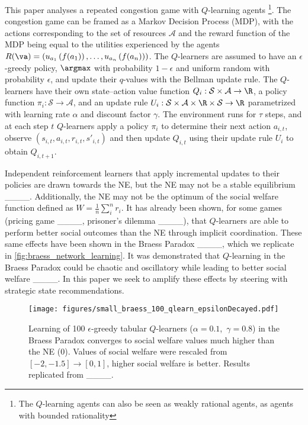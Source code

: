 This paper analyses a repeated congestion game with $Q$-learning agents \footnote{The $Q$-learning agents can also be seen as weakly rational agents, as agents with bounded rationality}. The congestion game can be framed as a Markov Decision Process (MDP), with the actions corresponding to the set of resources $\mathcal{A}$ and the reward function of the MDP being equal to the utilities experienced by the agents $R(\va) = \left(u_{a_1}\left(f(a_1)\right), \dots, u_{a_n}\left(f(a_n)\right)\right)$. The $Q$-learners are assumed to have an $\epsilon$-greedy policy, $\argmax$ with probability $1-\epsilon$ and uniform random with probability $\epsilon$, and update their $q$-values with the Bellman update rule. The $Q$-learners have their own state--action value function $Q_{i}: \mathcal{S} \times \mathcal{A} \rightarrow \R$, a policy function $\pi_i: \mathcal{S} \rightarrow \mathcal{A}$, and an update rule $U_i: \mathcal{S} \times \mathcal{A} \times \R \times \mathcal{S} \rightarrow \R$ parametrized with learning rate $\alpha$ and discount factor $\gamma$. The environment runs for $\tau$ steps, and at each step $t$ $Q$-learners apply a policy $\pi_i$ to determine their next action $a_{i,t}$, observe $(s_{i,t}, a_{i,t}, r_{i,t}, s'_{i,t})$ and then update $Q_{i,t}$ using their update rule $U_i$ to obtain $Q_{i,t+1}$.

Independent reinforcement learners that apply incremental updates to their policies are drawn towards the NE, but the NE may not be a stable equilibrium ____. Additionally, the NE may not be the optimum of the social welfare function defined as $W=\frac{1}{n}\sum_{i}^n r_i$. It has already been shown, for some games (pricing game ____, prisoner's dilemma ____), that $Q$-learners are able to perform better social outcomes than the NE through implicit coordination. These same effects have been shown in the Braess Paradox ____, which we replicate in \autoref{fig:braess_network_learning}. It was demonstrated that $Q$-learning in the Braess Paradox could be chaotic and oscillatory while leading to better social welfare ____. In this paper we seek to amplify these effects by steering with strategic state recommendations.

\begin{figure}[!ht]
\centering
\texttt{[image: figures/small\_braess\_100\_qlearn\_epsilonDecayed.pdf]} \\
\caption{Learning of 100 $\epsilon$-greedy tabular $Q$-learners \mbox{($\alpha=0.1$, $\gamma=0.8$)} in the Braess Paradox converges to social welfare values much higher than the NE (0). Values of social welfare were rescaled from \mbox{$[-2,-1.5]\rightarrow[0,1]$}, higher social welfare is better. Results replicated from ____.}
\label{fig:braess_network_learning}
\end{figure}

